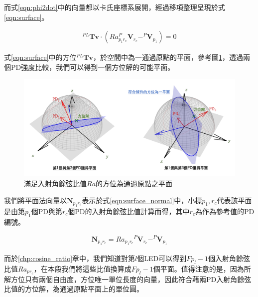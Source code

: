         而式\ref{eqn:phi2dot}中的向量都以卡氏座標系展開，經過移項整理呈現於式\ref{eqn:surface}。

            \begin{gather}
                 \label{eqn:surface}
                 ^{PL}\boldsymbol{Tv} \cdot(Ra_{p_1r_c} ^P\boldsymbol{V}_{r_c}-
                 ^P\boldsymbol{V}_{p_1})=0
            \end{gather}

        式\ref{eqn:surface}中的方位$^{PL}\boldsymbol{Tv}$，於空間中為一通過原點的平面，參考圖\ref{pic:solve_surface}，透過兩個PD強度比較，我們可以得到一個方位解的可能平面。
       

       \begin{figure}[h!]
        \centering
        \includegraphics[width=14cm]{ch3pic/solve_surface.png}
        \caption{滿足入射角餘弦比值$Ra$的方位為通過原點之平面}
        \label{pic:solve_surface}
        \end{figure}

         
        我們將平面法向量以$\boldsymbol{N}_{p_1r_c}$表示於式\ref{eqn:surface_normal}中，小標$p_1,r_c$代表該平面是由第$p_1$個PD與第$r_c$個PD的入射角餘弦比值計算而得，其中$r_c$為作為參考值的PD編號。
        
        \begin{gather}
            \label{eqn:surface_normal}
            \boldsymbol{N}_{p_1r_c}  = {Ra_{p_1r_c}}{} ^P\boldsymbol{V}_{r_c}-
            ^P\boldsymbol{V}_{p_1}
       \end{gather}
        
        而於\ref{chp:cosine_ratio}章中，我們知道對第$l$個LED可以得到$Fp_l-1$個入射角餘弦比值$Ra_{pr_c}$，在本段我們將這些比值換算成$Fp_l-1$個平面。值得注意的是，因為所解方位只有兩個自由度，方位唯一單位長度的向量，因此符合藉兩PD入射角餘弦比值的方位解，為通過原點平面上的單位圓。


